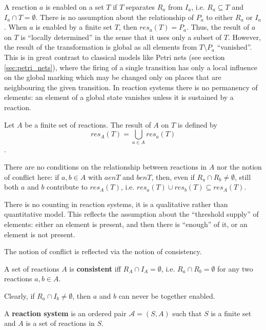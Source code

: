 A reaction $a$ is enabled on a set $T$ if $T$ separates $R_a$ from $I_a$, i.e. $R_a\subseteq T$ and $I_a\cap T = \emptyset$. There is no assumption about the relationship of $P_a$ to either $R_a$ or $I_a$. When $a$ is enabled by a finite set $T$, then $res_a(T) = P_a$. Thus, the result of $a$ on $T$ is ``locally determined'' in the sense that it uses only a subset of $T$. However, the result of the transformation is global as all elements from $T \setminus P_a$ ``vanished''. This is in great contrast to classical models like Petri nets (see section \ref{sec:petri_nets}), where the firing of a single transition has only a local influence on the global marking which may be changed only on places that are neighbouring the given transition. In reaction systems there is no permanency of elements: an element of a global state vanishes unless it is sustained by a reaction.

\begin{definition}
  Let $A$ be a finite set of reactions. The result of $A$ on $T$ is defined by $$res_A(T) = \bigcup_{a\in A} res_a(T)$$.
\end{definition}

There are no conditions on the relationship between reactions in $A$ nor the notion of conflict here: if $a,b\in A$ with $a \mathrel{en} T$ and $b \mathrel{en} T$, then, even if $R_a\cap R_b\neq\emptyset$, still both $a$ and $b$ contribute to $res_A(T)$, i.e. $res_a(T)\cup res_b(T) \subseteq res_A(T)$.

There is no counting in reaction systems, it is a qualitative rather than quantitative model. This reflects the assumption about the ``threshold supply'' of elements: either an element is present, and then there is ``enough'' of it, or an element is not present.

The notion of conflict is reflected via the notion of consistency.

\begin{definition}
  A set of reactions $A$ is {\bf consistent} iff $R_A\cap I_A = \emptyset$, i.e. $R_a\cap R_b = \emptyset$ for any two reactions $a,b \in A$.
\end{definition}

Clearly, if $R_a\cap I_b\neq\emptyset$, then $a$ and $b$ can never be together enabled.

\begin{definition}
  A {\bf reaction system} is an ordered pair $\mathcal{A} = (S, A)$ such that $S$ is a finite set and $A$ is a set of reactions in $S$.
\end{definition}

